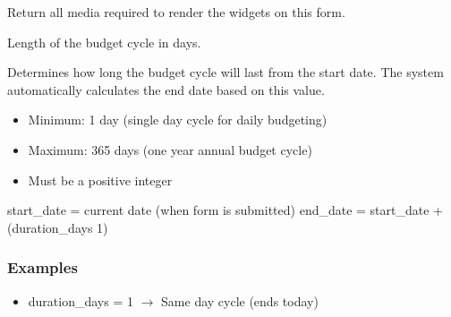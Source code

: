 \documentclass[letterpaper,10pt,english]{sphinxmanual}
\begin{document}
\begin{fulllineitems}
\begin{fulllineitems}
\label{\detokenize{expensesApp:expensesApp.froms.CycleForm.media}}
\pysigstartsignatures
\pysigline
{}
\pysigstopsignatures
\sphinxAtStartPar
Return all media required to render the widgets on this form.

\end{fulllineitems}


\begin{fulllineitems}
\label{\detokenize{expensesApp:expensesApp.froms.CycleForm.duration_days}}
\pysigstartsignatures
\pysigline
{}
\pysigstopsignatures
\sphinxAtStartPar
Length of the budget cycle in days.

\sphinxAtStartPar
Determines how long the budget cycle will last from the start date.
The system automatically calculates the end date based on this value.
\begin{description}
\begin{itemize}
\item {} 
\sphinxAtStartPar
Minimum: 1 day (single day cycle \sphinxhyphen{} for daily budgeting)

\item {} 
\sphinxAtStartPar
Maximum: 365 days (one year \sphinxhyphen{} annual budget cycle)

\item {} 
\sphinxAtStartPar
Must be a positive integer

\end{itemize}

\sphinxAtStartPar
start\_date = current date (when form is submitted)
end\_date = start\_date + (duration\_days \sphinxhyphen{} 1)

\end{description}
\subsubsection*{Examples}
\begin{itemize}
\item {} 
\sphinxAtStartPar
duration\_days = 1 \(\rightarrow\) Same day cycle (ends today)


\end{itemize}
\end{fulllineitems}
\end{fulllineitems}
\end{document}
